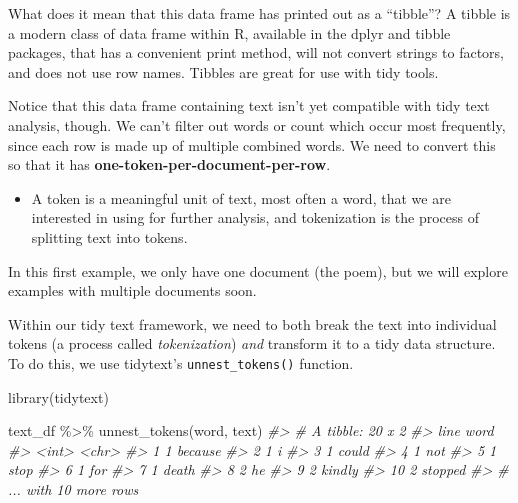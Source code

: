 \documentclass[
]{book}
\newenvironment{Shaded}{\begin{snugshade}}{\end{snugshade}}
\newcommand{\CommentTok}[1]{\textcolor[rgb]{0.56,0.35,0.01}{\textit{#1}}}
\newcommand{\FunctionTok}[1]{\textcolor[rgb]{0.00,0.00,0.00}{#1}}
\newcommand{\NormalTok}[1]{#1}
\newcommand{\SpecialCharTok}[1]{\textcolor[rgb]{0.00,0.00,0.00}{#1}}
\newenvironment{rmdblock}[1]
  {\begin{shaded*}
  \begin{itemize}
  \renewcommand{\labelitemi}{
    \raisebox{-.7\height}[0pt][0pt]{
      {\setkeys{Gin}{width=3em,keepaspectratio}\texttt{[image: images/\#1]}}
    }
  }
  \item
  }
  {
  \end{itemize}
  \end{shaded*}
  }
\newenvironment{rmdexercise}
  {\begin{rmdblock}{exercise}}
  {\end{rmdblock}}
\begin{document}
What does it mean that this data frame has printed out as a ``tibble''? A tibble is a modern class of data frame within R, available in the dplyr and tibble packages, that has a convenient print method, will not convert strings to factors, and does not use row names. Tibbles are great for use with tidy tools.

Notice that this data frame containing text isn't yet compatible with tidy text analysis, though. We can't filter out words or count which occur most frequently, since each row is made up of multiple combined words. We need to convert this so that it has \textbf{one-token-per-document-per-row}.

\begin{rmdexercise}
A token is a meaningful unit of text, most often a word, that we are
interested in using for further analysis, and tokenization is the
process of splitting text into tokens.
\end{rmdexercise}

In this first example, we only have one document (the poem), but we will explore examples with multiple documents soon.

Within our tidy text framework, we need to both break the text into individual tokens (a process called \emph{tokenization}) \emph{and} transform it to a tidy data structure. To do this, we use tidytext's \texttt{unnest\_tokens()} function.

\begin{Shaded}
\begin{Highlighting}[]
\FunctionTok{library}\NormalTok{(tidytext)}

\NormalTok{text\_df }\SpecialCharTok{\%\textgreater{}\%}
  \FunctionTok{unnest\_tokens}\NormalTok{(word, text)}
\CommentTok{\#\textgreater{} \# A tibble: 20 x 2}
\CommentTok{\#\textgreater{}     line word   }
\CommentTok{\#\textgreater{}    \textless{}int\textgreater{} \textless{}chr\textgreater{}  }
\CommentTok{\#\textgreater{}  1     1 because}
\CommentTok{\#\textgreater{}  2     1 i      }
\CommentTok{\#\textgreater{}  3     1 could  }
\CommentTok{\#\textgreater{}  4     1 not    }
\CommentTok{\#\textgreater{}  5     1 stop   }
\CommentTok{\#\textgreater{}  6     1 for    }
\CommentTok{\#\textgreater{}  7     1 death  }
\CommentTok{\#\textgreater{}  8     2 he     }
\CommentTok{\#\textgreater{}  9     2 kindly }
\CommentTok{\#\textgreater{} 10     2 stopped}
\CommentTok{\#\textgreater{} \# ... with 10 more rows}
\end{Highlighting}
\end{Shaded}
\end{document}
